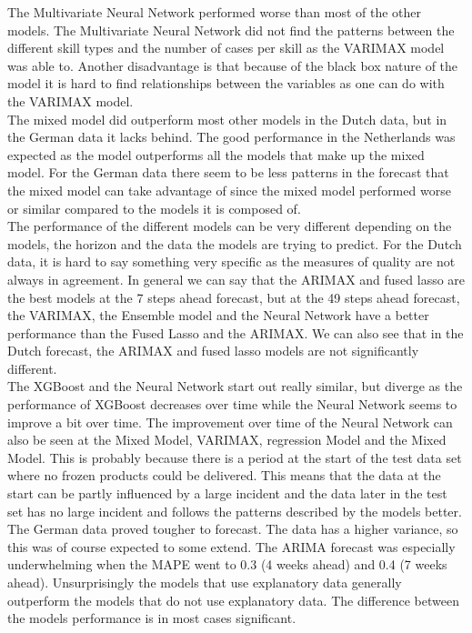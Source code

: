 The Multivariate Neural Network performed worse than most of the other models. The Multivariate Neural Network did not find the patterns between the different skill types and the number of cases per skill as the VARIMAX model was able to. Another disadvantage is that because of the black box nature of the model it is hard to find relationships between the variables as one can do with the VARIMAX model.\\

The mixed model did outperform most other models in the Dutch data, but in the German data it lacks behind. The good performance in the Netherlands was expected as the model outperforms all the models that make up the mixed model. For the German data there seem to be less patterns in the forecast that the mixed model can take advantage of since the mixed model performed worse or similar compared to the models it is composed of.\\

The performance of the different models can be very different depending on the models, the horizon and the data the models are trying to predict. For the Dutch data, it is hard to say something very specific as the measures of quality are not always in agreement. In general we can say that the ARIMAX and fused lasso are the best models at the 7 steps ahead forecast, but at the 49 steps ahead forecast, the VARIMAX, the Ensemble model and the Neural Network have a better performance than the Fused Lasso and the ARIMAX. We can also see that in the Dutch forecast, the ARIMAX and fused lasso models are not significantly different.\\

The XGBoost and the Neural Network start out really similar, but diverge as the performance of XGBoost decreases over time while the Neural Network seems to improve a bit over time. The improvement over time of the Neural Network can also be seen at the Mixed Model, VARIMAX, regression Model and the Mixed Model. This is probably because there is a period at the start of the test data set where no frozen products could be delivered. This means that the data at the start can be partly influenced by a large incident and the data later in the test set has no large incident and follows the patterns described by the models better.\\

The German data proved tougher to forecast. The data has a higher variance, so this was of course expected to some extend. The ARIMA forecast was especially underwhelming when the MAPE went to 0.3 (4 weeks ahead) and 0.4 (7 weeks ahead). Unsurprisingly the models that use explanatory data generally outperform the models that do not use explanatory data. The difference between the models performance is in most cases significant.\\

